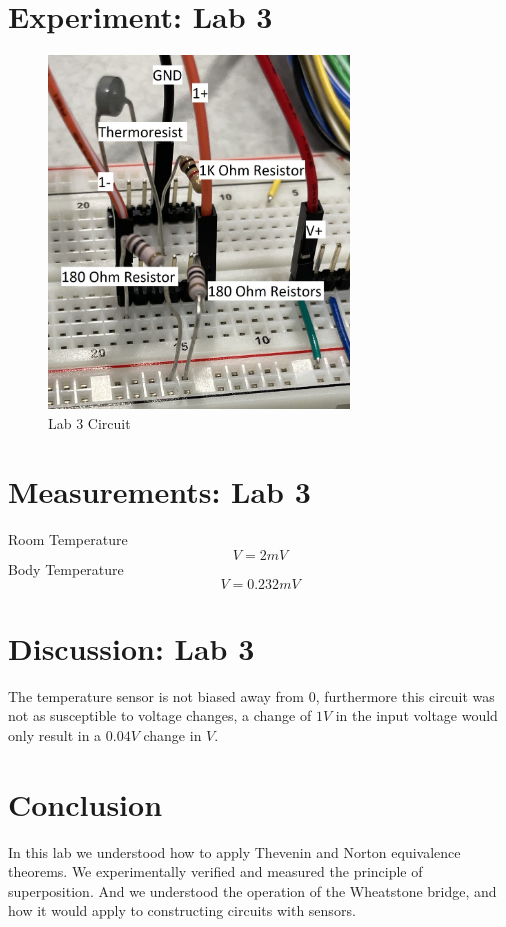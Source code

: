 \documentclass[12pt]{article}
\begin{document}
\section*{Experiment: Lab 3}
\begin{figure}[h]
\includegraphics[width=8cm]{Lab3 Circuit}
\centering
\caption{Lab 3 Circuit}
\end{figure}
\section*{Measurements: Lab 3}
Room Temperature
$$V=2mV$$
Body Temperature
$$V=0.232mV$$
\pagebreak
\section*{Discussion: Lab 3}
The temperature sensor is not biased away from 0, furthermore this circuit was not as susceptible to voltage changes, a change of $1V$ in the input voltage would only result in a $0.04V$ change in $V$.
\pagebreak
\section*{Conclusion}
In this lab we understood how to apply Thevenin and Norton equivalence theorems. We experimentally verified and measured the principle of superposition. And we understood the operation of the Wheatstone bridge, and how it would apply to constructing circuits with sensors. 
\end{document}
